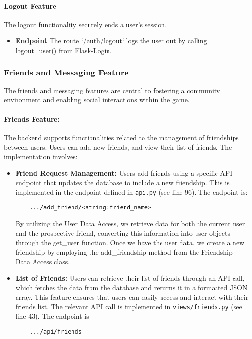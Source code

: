 \documentclass[12pt]{article}
\begin{document}
\paragraph{Logout Feature}
The logout functionality securely ends a user's session.
\begin{itemize}
    \item \textbf{Endpoint} The route `/auth/logout` logs the user out by calling logout\_user() from Flask-Login.
\end{itemize}
\subsubsection{Friends and Messaging Feature}
The friends and messaging features are central to fostering a community environment and enabling social interactions within the game.
\paragraph{Friends Feature:}
The backend supports functionalities related to the management of friendships between users. Users can add new friends, and view their list of friends. The implementation involves:
\begin{itemize}
    \item \textbf{Friend Request Management:} Users add friends using a specific API endpoint that updates the database to include a new friendship. This is implemented in the endpoint defined in \texttt{api.py} (see line 96). The endpoint is:
    \begin{verbatim}
    .../add_friend/<string:friend_name>
    \end{verbatim}
    By utilizing the User Data Access, we retrieve data for both the current user and the prospective friend, converting this information into user objects through the get\_user function. Once we have the user data, we create a new friendship by employing the add\_friendship method from the Friendship Data Access class.
    \item \textbf{List of Friends:} Users can retrieve their list of friends through an API call, which fetches the data from the database and returns it in a formatted JSON array. This feature ensures that users can easily access and interact with their friends list. The relevant API call is implemented in \texttt{views/friends.py} (see line 43). The endpoint is:
    \begin{verbatim}
    .../api/friends
    \end{verbatim}
\end{itemize}
\end{document}
